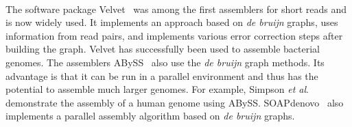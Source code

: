 \paragraph{}
The software package Velvet~\cite{Zerbino2008} was among the first assemblers for short reads and is now widely used. It implements an approach based on {\em de bruijn} graphs, uses information from read pairs, and implements various error correction steps after building the graph. Velvet has successfully been used to assemble bacterial genomes. The assemblers ABySS~\cite{Simpson2009} also use the {\em de bruijn} graph methods. Its advantage is that it can be run in a parallel environment and thus has the potential to assemble much larger genomes. For example, Simpson {\em et al}. demonstrate the assembly of a human genome using ABySS. SOAPdenovo~\cite{Li2008} also implements a parallel assembly algorithm based on {\em de bruijn} graphs. 
